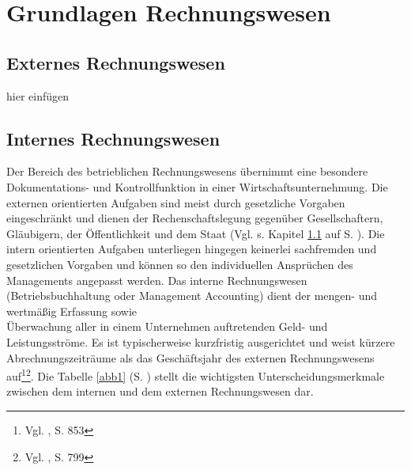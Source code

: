 

\section{Grundlagen Rechnungswesen}
\subsection{Externes Rechnungswesen}\label{ssec:externesRechnungswesen}

hier einfügen



\subsection{Internes Rechnungswesen}
\label{ssec:internesRechnungswesen}
Der Bereich des betrieblichen Rechnungswesens übernimmt eine besondere Dokumentations- und Kontrollfunktion in einer Wirtschaftsunternehmung.
Die externen orientierten Aufgaben sind meist durch gesetzliche Vorgaben eingeschränkt und dienen der Rechenschaftslegung gegenüber Gesellschaftern, Gläubigern, der Öffentlichkeit und dem Staat (Vgl. s. Kapitel \ref{ssec:externesRechnungswesen} auf S. \pageref{ssec:externesRechnungswesen}).
Die intern orientierten Aufgaben unterliegen hingegen keinerlei sachfremden und gesetzlichen Vorgaben und können so den individuellen Ansprüchen des Managements angepasst werden. Das interne Rechnungswesen (Betriebsbuchhaltung oder Management Accounting) dient der mengen- und wertmäßig Erfassung sowie\\ Überwachung aller in einem Unternehmen auftretenden Geld- und Leistungsströme. Es ist typischerweise kurzfristig ausgerichtet und weist kürzere Abrechnungszeiträume als das Geschäftsjahr des externen Rechnungswesens auf\footnote{Vgl. \cite{Wohe2000}, S. 853}\footnote{Vgl. \cite{Schierenbeck2008}, S. 799}.
Die Tabelle \ref{abb1} (S. \pageref{abb1}) stellt die wichtigsten Unterscheidungsmerkmale zwischen dem internen und dem externen Rechnungswesen dar.\\
